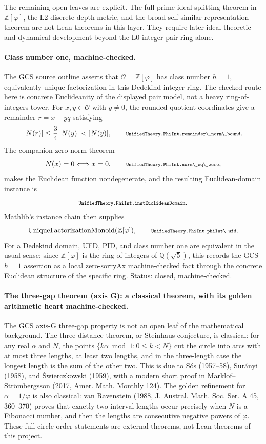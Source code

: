 \documentclass[11pt]{article}
\newcommand{\lean}[1]{\relax\ifmmode\hbox{\scriptsize\ttfamily\detokenize{#1}}\else{\small\texttt{\detokenize{#1}}}\fi}
\begin{document}
The remaining open leaves are explicit.  The full prime-ideal splitting theorem in $\mathbb Z[\varphi]$, the L2 discrete-depth metric, and the broad self-similar representation theorem are not Lean theorems in this layer.  They require later ideal-theoretic and dynamical development beyond the L0 integer-pair ring alone.

\paragraph{Class number one, machine-checked.}
The GCS source outline asserts that $\mathcal O=\mathbb Z[\varphi]$ has class number $h=1$, equivalently unique factorization in this Dedekind integer ring.  The checked route here is concrete Euclideanity of the displayed pair model, not a heavy ring-of-integers tower.  For $x,y\in\mathcal O$ with $y\ne0$, the rounded quotient coordinates give a remainder $r=x-yq$ satisfying
$$
  |N(r)|\le \frac34\,|N(y)|<|N(y)|,
  \qquad
  \lean{UnifiedTheory.PhiInt.remainder\_norm\_bound}.
$$
The companion zero-norm theorem
$$
  N(x)=0\Longleftrightarrow x=0,
  \qquad
  \lean{UnifiedTheory.PhiInt.norm\_eq\_zero},
$$
makes the Euclidean function nondegenerate, and the resulting Euclidean-domain instance is
$$
  \lean{UnifiedTheory.PhiInt.instEuclideanDomain}.
$$
Mathlib's instance chain then supplies
$$
  \operatorname{UniqueFactorizationMonoid}(\mathbb Z[\varphi]),
  \qquad
  \lean{UnifiedTheory.PhiInt.phiInt\_ufd}.
$$
For a Dedekind domain, UFD, PID, and class number one are equivalent in the usual sense; since $\mathbb Z[\varphi]$ is the ring of integers of $\mathbb Q(\sqrt5)$, this records the GCS $h=1$ assertion as a local zero-sorryAx machine-checked fact through the concrete Euclidean structure of the specific ring.  Status: closed, machine-checked.

\paragraph{The three-gap theorem (axis G): a classical theorem, with its golden arithmetic heart machine-checked.}
The GCS axis-G three-gap property is not an open leaf of the mathematical background.  The three-distance theorem, or Steinhaus conjecture, is classical: for any real $\alpha$ and $N$, the points $\{k\alpha\bmod 1:0\le k<N\}$ cut the circle into arcs with at most three lengths, at least two lengths, and in the three-length case the longest length is the sum of the other two.  This is due to S\'os (1957--58), Sur\'anyi (1958), and \'{S}wierczkowski (1959), with a modern short proof in Marklof--Str\"ombergsson (2017, Amer. Math. Monthly 124).  The golden refinement for $\alpha=1/\varphi$ is also classical: van Ravenstein (1988, J. Austral. Math. Soc. Ser. A 45, 360--370) proves that exactly two interval lengths occur precisely when $N$ is a Fibonacci number, and then the lengths are consecutive negative powers of $\varphi$.  These full circle-order statements are external theorems, not Lean theorems of this project.
\end{document}
